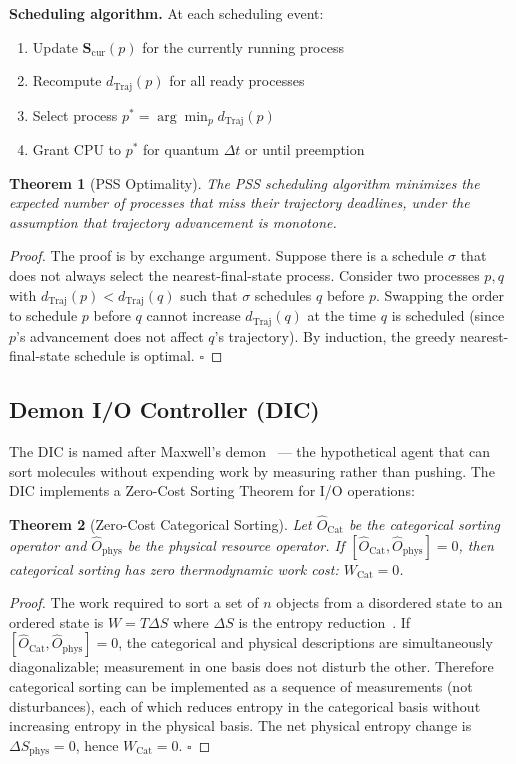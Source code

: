 \documentclass[12pt,twocolumn]{article}
\newtheorem{theorem}{Theorem}[section]
\DeclareMathOperator{\Cat}{Cat}
\DeclareMathOperator{\Traj}{Traj}
\begin{document}
\textbf{Scheduling algorithm.} At each scheduling event:
\begin{enumerate}
\item Update $\mathbf{S}_{\text{cur}}(p)$ for the currently running process
\item Recompute $d_{\Traj}(p)$ for all ready processes
\item Select process $p^* = \arg\min_p d_{\Traj}(p)$
\item Grant CPU to $p^*$ for quantum $\Delta t$ or until preemption
\end{enumerate}

\begin{theorem}[PSS Optimality]
The PSS scheduling algorithm minimizes the expected number of processes that miss their trajectory deadlines, under the assumption that trajectory advancement is monotone.
\end{theorem}

\begin{proof}
The proof is by exchange argument. Suppose there is a schedule $\sigma$ that does not always select the nearest-final-state process. Consider two processes $p, q$ with $d_{\Traj}(p) < d_{\Traj}(q)$ such that $\sigma$ schedules $q$ before $p$. Swapping the order to schedule $p$ before $q$ cannot increase $d_{\Traj}(q)$ at the time $q$ is scheduled (since $p$'s advancement does not affect $q$'s trajectory). By induction, the greedy nearest-final-state schedule is optimal. $\square$
\end{proof}

\subsection{Demon I/O Controller (DIC)}

The DIC is named after Maxwell's demon~\cite{jaynes1957information} --- the hypothetical agent that can sort molecules without expending work by measuring rather than pushing. The DIC implements a Zero-Cost Sorting Theorem for I/O operations:

\begin{theorem}[Zero-Cost Categorical Sorting]
\label{thm:zero_cost}
Let $\hat{O}_{\Cat}$ be the categorical sorting operator and $\hat{O}_{\text{phys}}$ be the physical resource operator. If $[\hat{O}_{\Cat}, \hat{O}_{\text{phys}}] = 0$, then categorical sorting has zero thermodynamic work cost: $W_{\Cat} = 0$.
\end{theorem}

\begin{proof}
The work required to sort a set of $n$ objects from a disordered state to an ordered state is $W = T \Delta S$ where $\Delta S$ is the entropy reduction~\cite{landauer1961irreversibility}. If $[\hat{O}_{\Cat}, \hat{O}_{\text{phys}}] = 0$, the categorical and physical descriptions are simultaneously diagonalizable; measurement in one basis does not disturb the other. Therefore categorical sorting can be implemented as a sequence of measurements (not disturbances), each of which reduces entropy in the categorical basis without increasing entropy in the physical basis. The net physical entropy change is $\Delta S_{\text{phys}} = 0$, hence $W_{\Cat} = 0$. $\square$
\end{proof}
\end{document}
